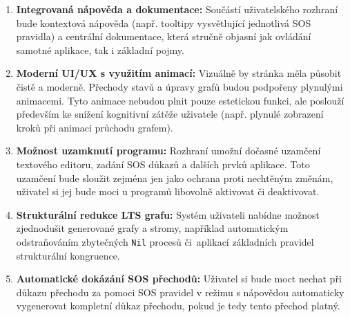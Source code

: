 \begin{enumerate}
    \item \textbf{Integrovaná nápověda a dokumentace:} 
    Součástí uživatelského rozhraní bude kontextová nápověda (např. tooltipy vysvětlující jednotlivá SOS pravidla) a centrální dokumentace, která stručně objasní jak ovládání samotné aplikace, tak i základní pojmy.
    
    \item \textbf{Moderní UI/UX s využitím animací:} 
    Vizuálně by stránka měla působit čistě a moderně. 
    Přechody stavů a úpravy grafů budou podpořeny plynulými animacemi. 
    Tyto animace nebudou plnit pouze estetickou funkci, ale poslouží především ke snížení kognitivní zátěže uživatele (např. plynulé zobrazení kroků při animaci průchodu grafem).

    \item \textbf{Možnost uzamknutí programu:}
    Rozhraní umožní dočasné uzamčení textového editoru, zadání SOS důkazů a dalších prvků aplikace. 
    Toto uzamčení bude sloužit zejména jen jako ochrana proti nechtěným změnám, uživatel si jej bude moci u programů libovolně aktivovat či deaktivovat.

    \item \textbf{Strukturální redukce LTS grafu:}
    Systém uživateli nabídne možnost zjednodušit generované grafy a stromy, například automatickým odstraňováním zbytečných \texttt{Nil} procesů či~aplikací základních pravidel strukturální kongruence.

    \item \textbf{Automatické dokázání SOS přechodů:}
    Uživatel si bude moct nechat při důkazu přechodu za pomoci SOS pravidel v režimu s nápovědou automaticky vygenerovat kompletní důkaz přechodu, pokud je tedy tento přechod platný.

\end{enumerate}

\endinput